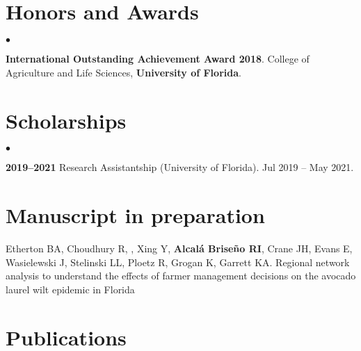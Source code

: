 \documentclass[margin,line]{res}
\newenvironment{list2}{
  \begin{list}{$\bullet$}{%
      \setlength{\itemsep}{0in}
      \setlength{\parsep}{0in} \setlength{\parskip}{0in}
      \setlength{\topsep}{0in} \setlength{\partopsep}{0in} 
      \setlength{\leftmargin}{0.2in}}}{\end{list}}
\begin{document}
\begin{resume}
\section{\sc Honors and Awards} 
\begin{list2}
\item[] {\bf International Outstanding Achievement Award 2018}. College of Agriculture and Life Sciences, {\bf University of Florida}.\\
\end{list2}

\section{\sc Scholarships} 
\begin{list2}
\item[] {\bf 2019--2021} 	Research Assistantship (University of Florida).  Jul 2019 -- May 2021. \\ %
\end{list2}


\section{\sc Manuscript in preparation}
\vspace{0.5cm}

Etherton BA, Choudhury R, , Xing Y, {\bf Alcal\'a Brise\~no RI}, Crane JH, Evans E,  Wasielewski J,  Stelinski LL, Ploetz R, Grogan K, Garrett KA. Regional network analysis to understand the effects of farmer management decisions on the avocado laurel wilt epidemic in Florida  \vspace{.05cm}


\section{\sc Publications}
\vspace{0.5cm}

\section{}


\end{resume}
\end{document}

